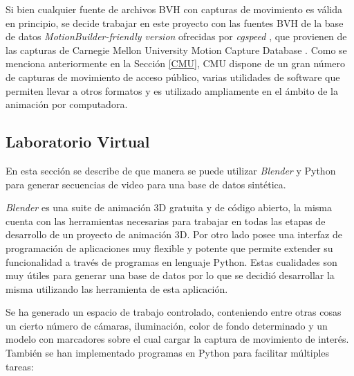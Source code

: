 Si bien cualquier fuente de archivos BVH con capturas de movimiento es válida en principio, se decide trabajar en este proyecto con las fuentes BVH de la base de datos \textit{MotionBuilder-friendly version} ofrecidas por \textit{cgspeed} \cite{cgspeed}, 
 que provienen de las capturas de Carnegie Mellon University Motion Capture Database \cite{CMU}.
 Como se menciona anteriormente en la Sección \ref{CMU}, CMU dispone de un gran número de capturas de movimiento de acceso público, varias utilidades de software que permiten llevar a otros formatos y es utilizado ampliamente en el ámbito de la animación por computadora.




\subsection{Laboratorio Virtual} %
En esta sección se describe de que manera se puede utilizar \textit{Blender} y Python para generar secuencias de video para una base de datos sintética.





\textit{Blender} es una suite de animación 3D gratuita y de código abierto, la misma cuenta con las herramientas necesarias para trabajar en todas las etapas de desarrollo de un proyecto de animación 3D. Por otro lado posee una interfaz de programación de aplicaciones muy flexible y potente que permite extender su funcionalidad a través de programas en lenguaje Python. Estas cualidades son muy útiles para generar una base de datos por lo que se decidió desarrollar la misma utilizando las herramienta de esta aplicación.

Se ha generado un espacio de trabajo controlado, conteniendo entre otras cosas un cierto número de cámaras, iluminación, color de fondo determinado y un modelo con marcadores sobre el cual cargar la captura de movimiento de interés. También se han implementado programas en Python para facilitar múltiples tareas:

